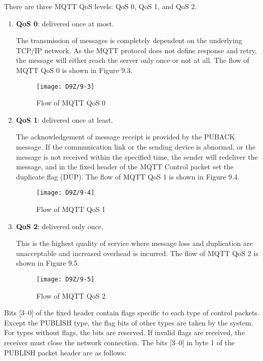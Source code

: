 \documentclass[a4paper,12pt]{book}
\begin{document}
There are three MQTT QoS levels: QoS 0, QoS 1, and QoS 2.

\begin{enumerate}[label=\alph*.,leftmargin=1.5em]
    \item \textbf{QoS 0}: delivered once at most.
    
    The transmission of messages is completely dependent on the underlying TCP/IP network. As the MQTT protocol does not define response and retry, the message will either reach the server only once or not at all. The flow of MQTT QoS 0 is shown in Figure 9.3.

    \begin{figure}[!h]
        \centering
        \texttt{[image: D9Z/9-3]}
        \caption{Flow of MQTT QoS 0}
    \end{figure}

    \item \textbf{QoS 1}: delivered once at least.
    
    The acknowledgement of message receipt is provided by the PUBACK message. If the communication link or the sending device is abnormal, or the message is not received within the specified time, the sender will redeliver the message, and in the fixed header of the MQTT Control packet set the duplicate flag (DUP). The flow of MQTT QoS 1 is shown in Figure 9.4.

    \begin{figure}[!h]
        \centering
        \texttt{[image: D9Z/9-4]}
        \caption{Flow of MQTT QoS 1}
    \end{figure}

    \item \textbf{QoS 2}: delivered only once.
    
    This is the highest quality of service where message loss and duplication are unacceptable and increased overhead is incurred. The flow of MQTT QoS 2 is shown in Figure 9.5.

    \begin{figure}[!h]
        \centering
        \texttt{[image: D9Z/9-5]}
        \caption{Flow of MQTT QoS 2}
    \end{figure}
\end{enumerate}

Bits [3–0] of the fixed header contain flags specific to each type of control packets. Except the PUBLISH type, the flag bits of other types are taken by the system. For types without flags, the bits are reserved. If invalid flags are received, the receiver must close the network connection. The bits [3–0] in byte 1 of the PUBLISH packet header are as follows:
\end{document}
